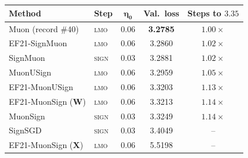 \begin{tabular}{@{}llccc@{}}
\toprule
\textbf{Method} & \textbf{Step} & $\boldsymbol{\eta_0}$ & \textbf{Val.\ loss} & \textbf{Steps to $3.35$} \\
\midrule
Muon (record \#40) & \textsc{lmo} & 0.06 & \textbf{3.2785} & $1.00\times$ \\
EF21-SignMuon & \textsc{lmo} & 0.06 & 3.2860 & $1.02\times$ \\
SignMuon & \textsc{sign} & 0.03 & 3.2881 & $1.02\times$ \\
MuonUSign & \textsc{lmo} & 0.06 & 3.2959 & $1.05\times$ \\
EF21-MuonUSign & \textsc{lmo} & 0.06 & 3.3203 & $1.13\times$ \\
EF21-MuonSign ($\mathbf{W}$) & \textsc{lmo} & 0.06 & 3.3213 & $1.14\times$ \\
MuonSign & \textsc{sign} & 0.03 & 3.3249 & $1.14\times$ \\
SignSGD & \textsc{sign} & 0.03 & 3.4049 & -- \\
\midrule
EF21-MuonSign ($\mathbf{X}$) & \textsc{lmo} & 0.06 & 5.5198 & -- \\
\bottomrule
\end{tabular}
